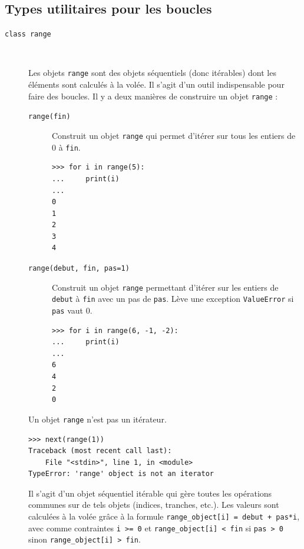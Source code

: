 \documentclass[a4paper, 10pt]{article}
\begin{document}
\subsection{Types utilitaires pour les boucles}

\begin{description}
    \item[\texttt{class range}]~
    
    Les objets \texttt{range} sont des objets séquentiels (donc itérables) dont les éléments sont
    calculés à la volée. Il s'agit d'un outil indispensable pour faire des boucles. Il y a deux manières de construire un objet \texttt{range} :

    \begin{description}
        \item[\texttt{range(fin)}] Construit un objet \texttt{range} qui permet d'itérer sur tous les entiers de 0 à \texttt{fin}.
            \begin{verbatim}
>>> for i in range(5):
...     print(i)
...
0
1
2
3
4
            \end{verbatim}
        \item[\texttt{range(debut, fin, pas=1)}] Construit un objet \texttt{range} permettant d'itérer sur les entiers de \texttt{debut} à \texttt{fin} avec un pas de \texttt{pas}. Lève une exception \texttt{ValueError} si \texttt{pas} vaut 0.
        \begin{verbatim}
>>> for i in range(6, -1, -2):
...     print(i)
...
6
4
2
0
        \end{verbatim} 
    \end{description}

    Un objet \texttt{range} n'est pas un itérateur.

    \begin{verbatim}
>>> next(range(1))
Traceback (most recent call last):
    File "<stdin>", line 1, in <module>
TypeError: 'range' object is not an iterator
    \end{verbatim}

    Il s'agit d'un objet séquentiel itérable qui gère toutes les opérations communes sur de tels objets (indices, tranches, etc.). Les valeurs sont calculées à la volée grâce à la formule \texttt{range_object[i] = debut + pas*i}, avec comme contraintes \texttt{i >= 0} et \texttt{range_object[i] < fin} si \texttt{pas > 0} sinon \texttt{range_object[i] > fin}.


\end{description}
\end{document}
